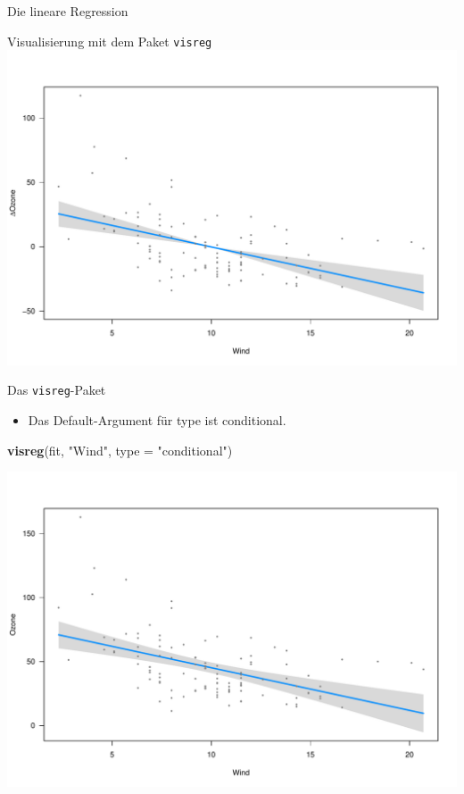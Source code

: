\documentclass[ignorenonframetext,]{beamer}
\newenvironment{Shaded}{}{}
\newcommand{\KeywordTok}[1]{\textcolor[rgb]{0.00,0.44,0.13}{\textbf{{#1}}}}
\newcommand{\DataTypeTok}[1]{\textcolor[rgb]{0.56,0.13,0.00}{{#1}}}
\newcommand{\StringTok}[1]{\textcolor[rgb]{0.25,0.44,0.63}{{#1}}}
\newcommand{\NormalTok}[1]{{#1}}
\providecommand{\tightlist}{%
\setlength{\itemsep}{0pt}\setlength{\parskip}{0pt}}
\begin{document}
\begin{frame}[fragile]{Die lineare Regression}
\begin{block}{Visualisierung mit dem Paket \texttt{visreg}}
\includegraphics{R_intern_files/figure-beamer/unnamed-chunk-306-1.pdf}

\end{block}

\begin{block}{Das \texttt{visreg}-Paket}

\begin{itemize}
\tightlist
\item
  Das Default-Argument für type ist conditional.
\end{itemize}

\begin{Shaded}
\begin{Highlighting}[]
\KeywordTok{visreg}\NormalTok{(fit, }\StringTok{"Wind"}\NormalTok{, }\DataTypeTok{type =} \StringTok{"conditional"}\NormalTok{)}
\end{Highlighting}
\end{Shaded}

\includegraphics{R_intern_files/figure-beamer/unnamed-chunk-307-1.pdf}


\end{block}
\end{frame}
\end{document}
